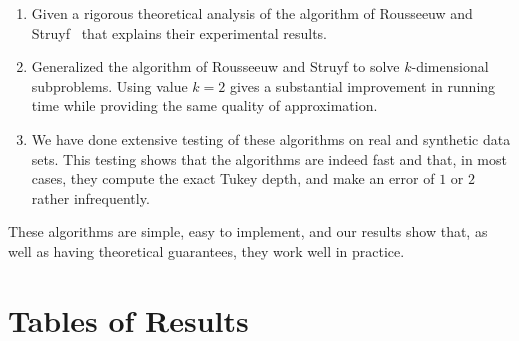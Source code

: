 \documentclass{patmorin}
\begin{document}

\begin{enumerate}
\item Given a rigorous theoretical analysis of the algorithm of Rousseeuw and Struyf~\cite{Rousseeuw98} that explains their experimental results.
\item Generalized the algorithm of Rousseeuw and Struyf to solve $k$-dimensional subproblems. Using value $k = 2$ gives a substantial improvement in running time while providing the same quality of approximation.
\item We have done extensive testing of these algorithms on real and synthetic data sets. This testing shows that the algorithms are indeed fast and that, in most cases, they compute the exact Tukey depth, and make an error of $1$ or $2$
rather infrequently.
\end{enumerate}

These algorithms are simple, easy to implement, and our results show that, as well as having theoretical guarantees, they work well in practice.




\appendix
\nolinenumbers

\section{Tables of Results} \label{app:results}

\end{document}
